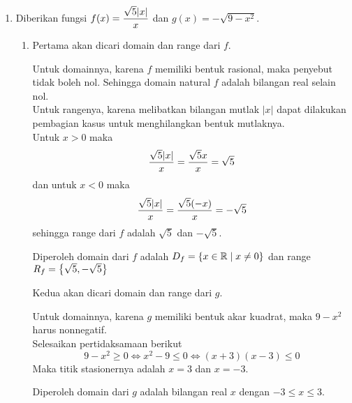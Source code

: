 \begin{enumerate}[leftmargin=*, label={\arabic*}.]
\item Diberikan fungsi $\ds f(x) = \frac{\sqrt{5}\abs{x}}{x}$ dan $g(x) = -\sqrt{9-x^{2}}$.
\begin{enumerate}[label={\alph*}.]
    \item Pertama akan dicari domain dan range dari $f$.
    
    Untuk domainnya, karena $f$ memiliki bentuk rasional, maka penyebut tidak boleh nol. 
    Sehingga domain natural $f$ adalah bilangan real selain nol.\\
    Untuk rangenya, karena melibatkan bilangan mutlak $|x|$ dapat dilakukan pembagian 
    kasus untuk menghilangkan bentuk mutlaknya.\\
    Untuk $x>0$ maka
    \[
        \frac{\sqrt{5}\abs{x}}{x} = \frac{\sqrt{5}x}{x} = \sqrt{5}
    \]
    dan untuk $x < 0$ maka
    \[
        \frac{\sqrt{5}\abs{x}}{x} = \frac{\sqrt{5}(-x)}{x} = -\sqrt{5}
    \]
    sehingga range dari $f$ adalah $\sqrt{5}$ dan $-\sqrt{5}$.

    Diperoleh domain dari $f$ adalah $D_f=\set*{x\in \mathbb{R} \mid x\neq 0}$ dan 
    range $R_f=\set*{\sqrt{5},-\sqrt{5}}$

    Kedua akan dicari domain dan range dari $g$.

    Untuk domainnya, karena $g$ memiliki bentuk akar kuadrat, maka $9-x^{2}$ harus nonnegatif.\\
    Selesaikan pertidaksamaan berikut
    \[
        9-x^{2} \geq 0 \iff x^{2}-9 \leq 0 \iff (x+3)(x-3) \leq 0
    \]
    Maka titik stasionernya adalah $x=3$ dan $x=-3$.
    \begin{center}
    \end{center}
    Diperoleh domain dari $g$ adalah bilangan real $x$ dengan $-3 \leq x \leq 3$.


\end{enumerate}
\end{enumerate}

